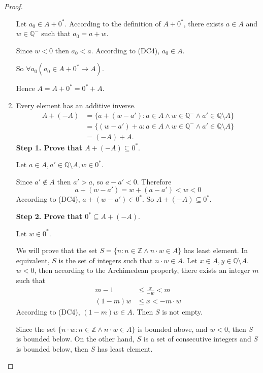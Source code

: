 \begin{proof}
\begin{enumerate}[label = (F\arabic*)]
              Let $a_{0}\in A + {0^{*}}$. According to the definition of $A + {0}^{*}$, there exists $a\in A$ and $w\in\mathbb{Q}^{-}$ such that $a_{0} = a + w$.

              Since $w < 0$ then $a_{0} < a$. According to (DC4), $a_{0}\in A$.

              So $\forall a_{0}(a_{0}\in A + {0}^{*} \rightarrow A)$.

              Hence $A = A + {0}^{*} = {0}^{*} + A$.
        \item Every element has an additive inverse.
              \begin{align*}
                  A + (-A) & = \{ a + (w - a') : a\in A\land w\in\mathbb{Q}^{-}\land a'\in\mathbb{Q}\setminus A \} \\
                           & = \{ (w - a') + a : a\in A\land w\in\mathbb{Q}^{-}\land a'\in\mathbb{Q}\setminus A \} \\
                           & = (-A) + A.
              \end{align*}
              \textbf{Step 1. Prove that $A + (-A)\subseteq {0}^{*}$}.

              Let $a\in A, a'\in \mathbb{Q}\setminus A, w\in {0}^{*}$.

              Since $a'\notin A$ then $a' > a$, so $a - a' < 0$. Therefore
              \[
                  a + (w - a') = w + (a - a') < w < 0
              \]
              According to (DC4), $a + (w - a')\in {0}^{*}$. So $A + (-A) \subseteq {0}^{*}$.
              \bigskip

              \textbf{Step 2. Prove that ${0}^{*}\subseteq A + (-A)$}.

              Let $w\in {0}^{*}$.

              We will prove that the set $S = \{ n : n\in\mathbb{Z} \land n\cdot w\in A \}$ has least element. In equivalent, $S$ is the set of integers such that $n\cdot w\in A$.
              Let $x\in A, y\in\mathbb{Q}\setminus A$. $w < 0$, then according to the Archimedean property, there exists an integer $m$ such that
              \begin{align*}
                  m - 1    & \le \frac{x}{-w} < m \\
                  (1 - m)w & \le x < -m\cdot w
              \end{align*}
              According to (DC4), $(1 - m)w\in A$. Then $S$ is not empty.

              Since the set $\{ n\cdot w : n\in\mathbb{Z}\land n\cdot w\in A \}$ is bounded above, and $w < 0$, then $S$ is bounded below. On the other hand, $S$ is a set of consecutive integers and $S$ is bounded below, then $S$ has least element.


\end{enumerate}
\end{proof}
